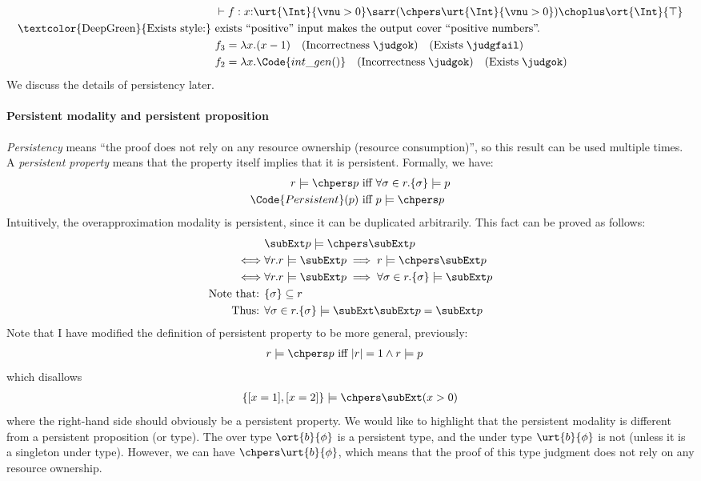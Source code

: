 \begin{align*}
  &\vdash f : x{:}\urt{\Int}{\vnu > 0} \sarr (\chpers \urt{\Int}{\vnu > 0}) \choplus \ort{\Int}{\top} 
  \\\text{\textcolor{DeepGreen}{Exists style:} }& \text{exists ``positive'' input makes the output cover ``positive numbers''.}
  \\& f_3 = \lambda x.(x - 1) \quad (\text{Incorrectness}\; \judgok) \quad (\text{Exists}\; \judgfail)
  \\& f_2 = \lambda x.\Code{int\_gen()} \quad (\text{Incorrectness}\; \judgok) \quad (\text{Exists}\; \judgok)
\end{align*}\noindent
We discuss the details of persistency later.

\paragraph{Persistent modality and persistent proposition} \emph{Persistency} means ``the proof does not rely on any resource ownership (resource consumption)'', so this result can be used multiple times. A \emph{persistent property} means that the property itself implies that it is persistent. Formally, we have:
\begin{align*}
  r \models \chpers p &\text{ iff } \forall \sigma \in r. \{\sigma \} \models p\\
  \Code{Persistent}(p) &\text{ iff } p \models \chpers p 
\end{align*}\noindent
Intuitively, the overapproximation modality is persistent, since it can be duplicated arbitrarily. This fact can be proved as follows:
\begin{align*}
  &\subExt p \models \chpers \subExt p
  \\\iff& \forall r. r \models \subExt p \implies r \models \chpers \subExt p
  \\\iff& \forall r. r \models \subExt p \implies \forall \sigma \in r. \{\sigma\} \models \subExt p
  \\\text{Note that: }& \{\sigma\} \subseteq r
  \\\text{Thus: }& \forall \sigma \in r. \{\sigma\} \models \subExt \subExt p = \subExt p 
\end{align*}\noindent
Note that I have modified the definition of persistent property to be more general, previously:
\begin{align*}
  r \models \chpers p &\text{ iff } |r| = 1 \land r \models p
\end{align*}\noindent
which disallows
\begin{align*}
  \{ [x=1], [x=2] \} \models \chpers \subExt (x > 0)
\end{align*}\noindent
where the right-hand side should obviously be a persistent property. We would like to highlight that the persistent modality is different from a persistent proposition (or type). The over type $\ort{b}{\phi}$ is a persistent type, and the under type $\urt{b}{\phi}$ is not (unless it is a singleton under type). However, we can have $\chpers \urt{b}{\phi}$, which means that the proof of this type judgment does not rely on any resource ownership.

